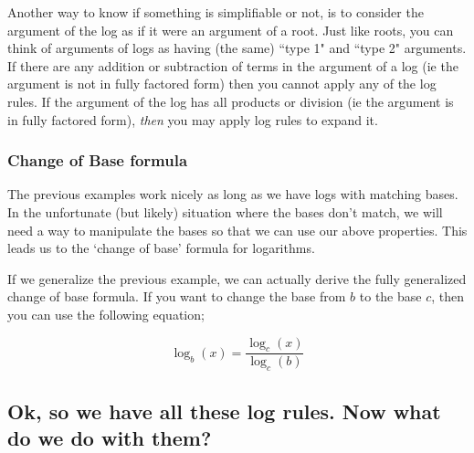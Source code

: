     Another way to know if something is simplifiable or not, is to consider the argument of the log as if it were an argument of a root. Just like roots, you can think of arguments of logs as having (the same) ``type 1" and ``type 2" arguments. If there are any addition or subtraction of terms in the argument of a log (ie the argument is not in fully factored form) then you cannot apply any of the log rules. If the argument of the log has all products or division (ie the argument is in fully factored form), \textit{then} you may apply log rules to expand it.
    
    \subsubsection{Change of Base formula}
        
        The previous examples work nicely as long as we have logs with matching bases. In the unfortunate (but likely) situation where the bases don't match, we will need a way to manipulate the bases so that we can use our above properties. This leads us to the `change of base' formula for logarithms.
        
        If we generalize the previous example, we can actually derive the fully generalized change of base formula. If you want to change the base from $b$ to the base $c$, then you can use the following equation;
        
        \[
            \log_b(x) = \frac{\log_c(x)}{\log_c(b)}
        \]
        
\subsection{Ok, so we have all these log rules. Now what do we do with them?}
     
